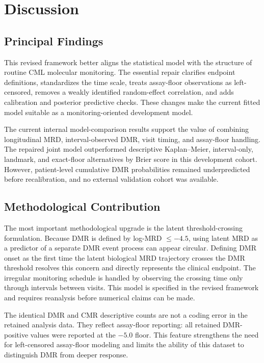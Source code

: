 \documentclass[11pt]{article}
\begin{document}
\section{Discussion}

\subsection{Principal Findings}

This revised framework better aligns the statistical model with the structure of routine CML molecular monitoring. The essential repair clarifies endpoint definitions, standardizes the time scale, treats assay-floor observations as left-censored, removes a weakly identified random-effect correlation, and adds calibration and posterior predictive checks. These changes make the current fitted model suitable as a monitoring-oriented development model.

The current internal model-comparison results support the value of combining longitudinal MRD, interval-observed DMR, visit timing, and assay-floor handling. The repaired joint model outperformed descriptive Kaplan--Meier, interval-only, landmark, and exact-floor alternatives by Brier score in this development cohort. However, patient-level cumulative DMR probabilities remained underpredicted before recalibration, and no external validation cohort was available.

\subsection{Methodological Contribution}

The most important methodological upgrade is the latent threshold-crossing formulation. Because DMR is defined by log-MRD \(\le -4.5\), using latent MRD as a predictor of a separate DMR event process can appear circular. Defining DMR onset as the first time the latent biological MRD trajectory crosses the DMR threshold resolves this concern and directly represents the clinical endpoint. The irregular monitoring schedule is handled by observing the crossing time only through intervals between visits. This model is specified in the revised framework and requires reanalysis before numerical claims can be made.

The identical DMR and CMR descriptive counts are not a coding error in the retained analysis data. They reflect assay-floor reporting: all retained DMR-positive values were reported at the \(-5.0\) floor. This feature strengthens the need for left-censored assay-floor modeling and limits the ability of this dataset to distinguish DMR from deeper response.
\end{document}
